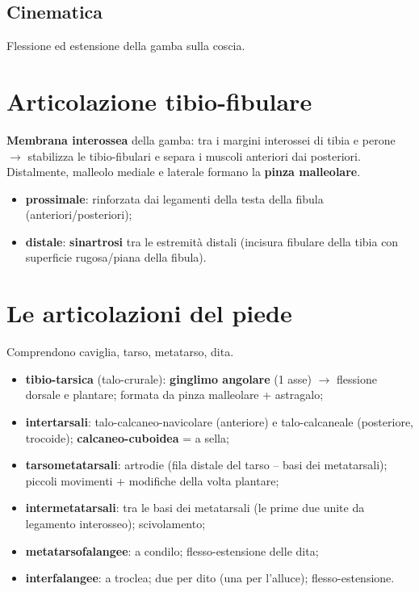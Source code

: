 \subsection{Cinematica}
Flessione ed estensione della gamba sulla coscia.

\section{Articolazione tibio-fibulare}

\textbf{Membrana interossea} della gamba: tra i margini interossei di tibia e perone $\rightarrow$
stabilizza le tibio-fibulari e separa i muscoli anteriori dai posteriori. Distalmente, malleolo
mediale e laterale formano la \textbf{pinza malleolare}.
\begin{itemize}
  \item \textbf{prossimale}: rinforzata dai legamenti della testa della fibula (anteriori/posteriori);
  \item \textbf{distale}: \textbf{sinartrosi} tra le estremità distali (incisura fibulare della tibia
    con superficie rugosa/piana della fibula).
\end{itemize}

\section{Le articolazioni del piede}

Comprendono caviglia, tarso, metatarso, dita.
\begin{itemize}
  \item \textbf{tibio-tarsica} (talo-crurale): \textbf{ginglimo angolare} (1 asse) $\rightarrow$
    flessione dorsale e plantare; formata da pinza malleolare + astragalo;
  \item \textbf{intertarsali}: talo-calcaneo-navicolare (anteriore) e talo-calcaneale (posteriore,
    trocoide); \textbf{calcaneo-cuboidea} = a sella;
  \item \textbf{tarsometatarsali}: artrodie (fila distale del tarso -- basi dei metatarsali); piccoli
    movimenti + modifiche della volta plantare;
  \item \textbf{intermetatarsali}: tra le basi dei metatarsali (le prime due unite da legamento
    interosseo); scivolamento;
  \item \textbf{metatarsofalangee}: a condilo; flesso-estensione delle dita;
  \item \textbf{interfalangee}: a troclea; due per dito (una per l'alluce); flesso-estensione.
\end{itemize}
